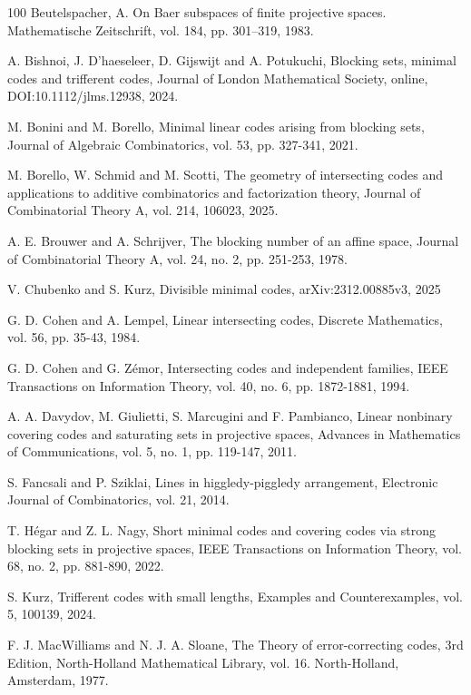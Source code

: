 \documentclass[10pt,a4paper]{article}
\begin{document}
\begin{thebibliography}{100}
 Beutelspacher, A. On Baer subspaces of finite projective spaces. Mathematische Zeitschrift, vol. 184, pp. 301–319, 1983.


 A. Bishnoi, J. D'haeseleer, D. Gijswijt and A. Potukuchi, Blocking sets, minimal codes and trifferent codes, Journal of London Mathematical Society, online, DOI:10.1112/jlms.12938, 2024.


    M. Bonini and M. Borello, Minimal linear codes arising from
blocking sets, Journal of Algebraic Combinatorics, vol. 53, pp. 327-341, 2021.

 M. Borello, W. Schmid and M. Scotti, The geometry of intersecting codes and applications to additive combinatorics and factorization theory, Journal of Combinatorial Theory A, vol. 214, 106023, 2025.


 A. E. Brouwer and A. Schrijver, The blocking number of an affine space, Journal of
Combinatorial Theory A, vol. 24, no. 2, pp. 251-253, 1978.

 V. Chubenko and S. Kurz, Divisible minimal codes, arXiv:2312.00885v3, 2025

 G. D. Cohen and A. Lempel, Linear intersecting codes, Discrete Mathematics, vol. 56, pp. 35-43, 1984.


 G. D. Cohen and G. Z\'{e}mor, Intersecting codes and independent families, IEEE Transactions on Information Theory, vol. 40, no. 6, pp. 1872-1881, 1994.


 A. A. Davydov, M. Giulietti, S. Marcugini and F. Pambianco, Linear nonbinary covering
codes and saturating sets in projective spaces, Advances in Mathematics of Communications, vol. 5, no. 1, pp. 119-147, 2011.


 S. Fancsali and P. Sziklai, Lines in higgledy-piggledy arrangement, Electronic Journal of
Combinatorics, vol. 21, 2014.



 T. H\'{e}gar and Z. L. Nagy, Short minimal codes and covering codes via strong blocking sets in projective spaces, IEEE Transactions on Information Theory, vol. 68, no. 2, pp. 881-890, 2022.



 S. Kurz, Trifferent codes with small lengths, Examples and Counterexamples, vol. 5, 100139, 2024.

 F. J.  MacWilliams and N. J. A. Sloane, The Theory of error-correcting codes, 3rd Edition, North-Holland Mathematical Library, vol. 16. North-Holland, Amsterdam, 1977.


\end{thebibliography}
\end{document}
